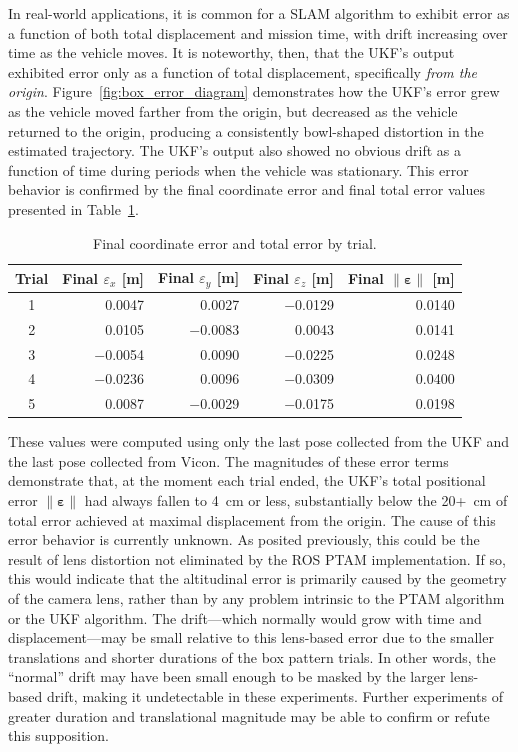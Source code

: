 In real-world applications, it is common for a SLAM algorithm to exhibit error as a function of both total displacement and mission time, with drift increasing over time as the vehicle moves. It is noteworthy, then, that the UKF's output exhibited error only as a function of total displacement, specifically \textit{from the origin}. Figure~\ref{fig:box_error_diagram} demonstrates how the UKF's error grew as the vehicle moved farther from the origin, but decreased as the vehicle returned to the origin, producing a consistently bowl-shaped distortion in the estimated trajectory. The UKF's output also showed no obvious drift as a function of time during periods when the vehicle was stationary. This error behavior is confirmed by the final coordinate error and final total error values presented in Table~\ref{tab:final_err}. 

\begin{table}[h]\centering
\caption[Final Coordinate Error and Final Total Error]{Final coordinate error and total error by trial.}
\begin{tabular}[c]{crrrr}
\toprule
Trial & Final $\varepsilon_{x}$ [m] & Final $\varepsilon_{y}$ [m] & Final $\varepsilon_{z}$ [m] & Final $\| \bm{\varepsilon} \|$ [m] \\
\hline
1 & 0.0047 & 0.0027 & $-$0.0129 & 0.0140 \\
2 & 0.0105 & $-$0.0083 & 0.0043 & 0.0141 \\
3 & $-$0.0054 & 0.0090 & $-$0.0225 & 0.0248 \\
4 & $-$0.0236 & 0.0096 & $-$0.0309 & 0.0400 \\
5 & 0.0087 & $-$0.0029 & $-$0.0175 & 0.0198 \\
\bottomrule
\end{tabular}
\label{tab:final_err}
\end{table}

These values were computed using only the last pose collected from the UKF and the last pose collected from Vicon. The magnitudes of these error terms demonstrate that, at the moment each trial ended, the UKF's total positional error $\| \bm{\varepsilon} \|$ had always fallen to 4~cm or less, substantially below the 20+~cm of total error achieved at maximal displacement from the origin. The cause of this error behavior is currently unknown. As posited previously, this could be the result of lens distortion not eliminated by the ROS PTAM implementation. If so, this would indicate that the altitudinal error is primarily caused by the geometry of the camera lens, rather than by any problem intrinsic to the PTAM algorithm or the UKF algorithm. The drift---which normally would grow with time and displacement---may be small relative to this lens-based error due to the smaller translations and shorter durations of the box pattern trials. In other words, the ``normal'' drift may have been small enough to be masked by the larger lens-based drift, making it undetectable in these experiments. Further experiments of greater duration and translational magnitude may be able to confirm or refute this supposition.